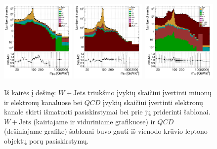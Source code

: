\documentclass[a4paper, 12pt, oneside]{article}
\newcommand{\WJets}{W\! +\!\mathrm{Jets}}
\newcommand{\QCD}{QC\! D}
\begin{document}
\begin{figure}[t!]
	\includegraphics[width=0.325\textwidth]{Magistrinis/WJETmu_fit.png}
	\includegraphics[width=0.325\textwidth]{Magistrinis/WJETe_fit.png}
	\includegraphics[width=0.325\textwidth]{Magistrinis/QCDe_fit.png}
	\vspace{-0.3cm}
	\caption{\label{fig:MassFit}
		Iš kairės į dešinę: $\WJets$ triukšmo įvykių skaičiui įvertinti miuonų ir elektronų kanaluose bei $\QCD$ įvykių
		skaičiui įvertinti elektronų kanale skirti išmatuoti pasiskirstymai bei prie jų priderinti šablonai.
		$\WJets$ (kairiajame ir viduriniame grafikuose) ir $\QCD$ (dešiniajame grafike) šablonai buvo gauti iš vienodo
		krūvio leptono objektų porų pasiskirstymų.}
\end{figure}
\end{document}
